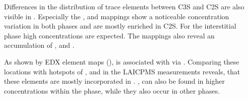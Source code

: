 
Differences in the distribution of trace elements between \ac{C3S} and \ac{C2S} are also visible in .
Especially the ,  and  mappings show a noticeable concentration variation in both phases and are mostly enriched in \ac{C2S}.
For the interstitial phase high  concentrations are expected.
The mappings also reveal an accumulation of , and .

As shown by \ac{EDX} element maps (),  is associated with  via .
Comparing these locations with hotspots of ,  and  in the \ac{LAICPMS} measurements reveals, that these elements are mostly incorporated in .
,  can also be found in higher concentrations within the  phase, while they also occur in other phases.







